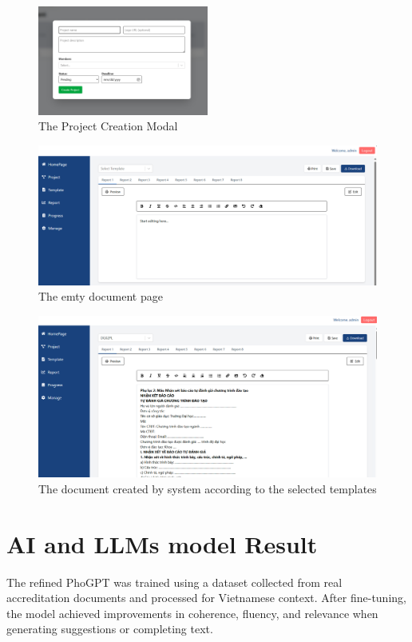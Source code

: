 \begin{figure}[h]
\centering
    \includegraphics[width=0.5\textwidth]{images/create_process.png}
    \caption{The Project Creation Modal} 
    \label{fig:create_process}
\end{figure}
\begin{figure}[h]
\centering
    \includegraphics[width=1\textwidth]{images/empty_docs.png}
    \caption{The emty document page} 
    \label{fig:empty_docs}
\end{figure}
\begin{figure}[h]
\centering
    \includegraphics[width=1\textwidth]{images/complete_create.png}
    \caption{The document created by system according to the selected templates} 
    \label{fig:complete_create}
\end{figure}

\section{AI and LLMs model Result}
The refined PhoGPT was trained using a dataset collected from real accreditation documents and processed for Vietnamese context. After fine-tuning, the model achieved improvements in coherence, fluency, and relevance when generating suggestions or completing text.

